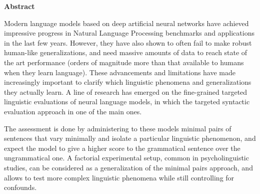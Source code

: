 \thispagestyle{plain}
\begin{center}
	\Large
	\vspace{1.8cm}
    \textbf{Abstract}
    	\vspace{0.9cm}
\end{center}

\normalsize
Modern language models based on deep artificial neural networks have achieved impressive progress in Natural Language Processing benchmarks and applications in the last few years. However, they have also shown to often fail to make robust human-like generalizations, and need massive amounts of data to reach state of the art performance (orders of magnitude more than that available to humans when they learn language). These advancements and limitations have made increasingly important to clarify which linguistic phenomena and generalizations they actually learn. A line of research has emerged on the fine-grained targeted linguistic evaluations of neural language models, in which the targeted syntactic evaluation approach in one of the main ones.

The assessment is done by administering to these models minimal pairs of sentences that vary minimally and isolate a particular linguistic phenomenon, and expect the model to give a higher score to the grammatical sentence over the ungrammatical one. A factorial experimental setup, common in psycholinguistic studies, can be considered as a generalization of the minimal pairs approach, and allows to test more complex linguistic phenomena while still controlling for confounds.


% 


